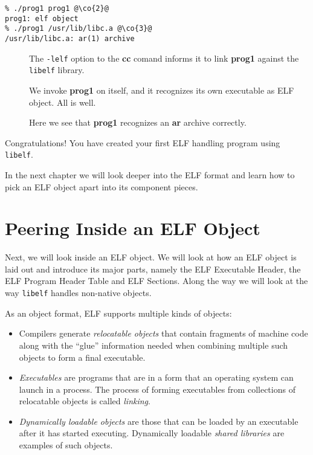 \documentclass[a4paper]{report}
\makeatletter
\newcommand{\firstterm}[1]{\textit{#1}}                 %
\newcommand{\library}[1]{\texttt{#1}}
\newcommand{\parameter}[1]{\texttt{#1}}
\newcommand{\tool}[1]{\textbf{#1}}
\newenvironment{callout}[2][blue]{%
  \begingroup\newcommand{\@cocolor}{#1}%
  \newcommand{\@cogroup}[1]{#2}}{\endgroup}
\newcommand{\@co}[1]{\framebox{\textbf{\color{\@cocolor}#1}}}
\newcommand{\co}[1]{%
  \hypertarget{\@cogroup.#1.co}{%
    \hyperlink{\@cogroup.#1.cr}{\@co{#1}}}}
\newcommand{\coref}[1]{%
  \hypertarget{\@cogroup.#1.cr}{%
    \hyperlink{\@cogroup.#1.co}{\@co{#1}}}}
\makeatother
\begin{document}
\begin{callout}[red]{scr1}
  \begin{lstlisting}[basicstyle=\ttfamily, language={},
      caption=Compiling and running prog1,
      label=scr.prog1]
% cc -o prog1 prog1.c -lelf @\co{1}@
% ./prog1 prog1 @\co{2}@
prog1: elf object
% ./prog1 /usr/lib/libc.a @\co{3}@
/usr/lib/libc.a: ar(1) archive
  \end{lstlisting}

  \begin{description}
  \item[\coref{1}] The \parameter{-lelf} option to the \tool{cc} comand
    informs it to link \tool{prog1} against the \library{libelf}
    library.
  \item[\coref{2}] We invoke \tool{prog1} on itself, and it recognizes
    its own executable as ELF object.  All is well.
  \item[\coref{3}] Here we see that \tool{prog1} recognizes an \tool{ar}
    archive correctly.
  \end{description}
\end{callout}

Congratulations!  You have created your first ELF handling program
using \library{libelf}.

In the next chapter we will look deeper into the ELF format and learn
how to pick an ELF object apart into its component pieces.

\chapter{Peering Inside an ELF Object}\label{chap.peering-inside}

Next, we will look inside an ELF object.  We will look at how an ELF
object is laid out and introduce its major parts, namely the ELF
Executable Header, the ELF Program Header Table and ELF Sections.
Along the way we will look at the way \library{libelf} handles
non-native objects.

As an object format, ELF supports multiple kinds of objects:

\begin{itemize}
\item Compilers generate \firstterm{relocatable objects} that contain fragments of
  machine code along with the ``glue'' information needed when
  combining multiple such objects to form a final executable.
\item \firstterm{Executables} are programs that are in a form that an
  operating system can launch in a process.  The process of forming
  executables from collections of relocatable objects is called
  \firstterm{linking}.
\item \firstterm{Dynamically loadable objects} are those that can be
  loaded by an executable after it has started executing.  Dynamically
  loadable \firstterm{shared libraries} are examples of such objects.
\end{itemize}
\end{document}
